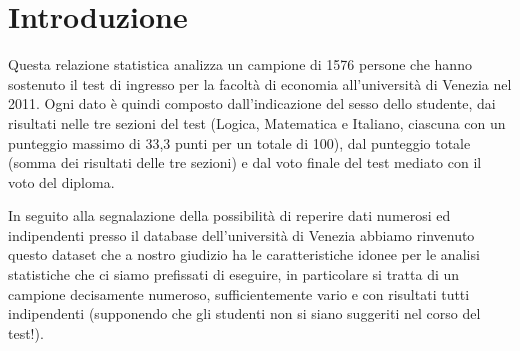 \section{Introduzione}
Questa relazione statistica analizza un campione di 1576 persone che hanno
sostenuto il test di ingresso per la facoltà di economia all’università di Venezia
nel 2011. Ogni dato è quindi composto dall'indicazione del sesso dello studente, dai risultati nelle tre sezioni del
test (Logica, Matematica e Italiano, ciascuna con un punteggio massimo di 33,3
punti per un totale di 100), dal punteggio totale (somma dei risultati delle tre
sezioni) e dal voto finale del test mediato con il voto del diploma.

In seguito alla segnalazione della possibilità di reperire dati numerosi ed
indipendenti presso il database dell’università di Venezia abbiamo rinvenuto
questo dataset che a nostro giudizio ha le caratteristiche idonee per le analisi
statistiche che ci siamo prefissati di eseguire, in particolare si tratta di un
campione decisamente numeroso, sufficientemente vario e con risultati tutti
indipendenti (supponendo che gli studenti non si siano suggeriti nel corso del
test!).
